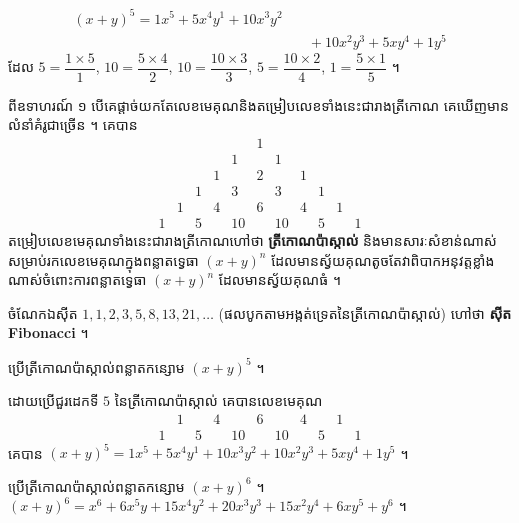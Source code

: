 \begin{example}[ឧទាហរណ៍ ២]
\[
\begin{aligned}
(x + y)^5 = 1x^5 + 5x^4y^1 + 10x^3y^2 &\\
&\quad + 10x^2y^3 + 5xy^4 + 1y^5
\end{aligned}
\]
ដែល $5 = \dfrac{1 \times 5}{1}$, \quad $10 = \dfrac{5 \times 4}{2}$, \quad $10 = \dfrac{10 \times 3}{3}$, \quad $5 = \dfrac{10 \times 2}{4}$, \quad $1 = \dfrac{5 \times 1}{5}$ ។
\end{example}

ពីឧទាហរណ៍ ១ បើគេផ្តាច់យកតែលេខមេគុណនិងតម្រៀបលេខទាំងនេះជារាងត្រីកោណ គេឃើញមានលំនាំគំរូជាច្រើន ។ គេបាន
\[
\begin{array}{ccccccccccc}
 & & & & & 1 & & & & & \\
 & & & & 1 & & 1 & & & & \\
 & & & 1 & & 2 & & 1 & & & \\
 & & 1 & & 3 & & 3 & & 1 & & \\
 & 1 & & 4 & & 6 & & 4 & & 1 & \\
1 & & 5 & & 10 & & 10 & & 5 & & 1
\end{array}
\]
តម្រៀបលេខមេគុណទាំងនេះជារាងត្រីកោណហៅថា \textbf{ត្រីកោណប៉ាស្កាល់} និងមានសារៈសំខាន់ណាស់សម្រាប់រកលេខមេគុណក្នុងពន្លាតទ្វេធា $(x + y)^n$ ដែលមានស្វ័យគុណតូចតែវាពិបាកអនុវត្តខ្លាំងណាស់ចំពោះការពន្លាតទ្វេធា $(x + y)^n$ ដែលមានស្វ័យគុណធំ ។

ចំណែកឯស៊ីត $1, 1, 2, 3, 5, 8, 13, 21, \ldots$ (ផលបូកតាមអង្កត់ទ្រេតនៃត្រីកោណប៉ាស្កាល់) ហៅថា \textbf{ស៊ីត Fibonacci} ។

\begin{example}[លំហាត់គំរូ ៤]
ប្រើត្រីកោណប៉ាស្កាល់ពន្លាតកន្សោម $(x + y)^5$ ។
\end{example}
\ans
ដោយប្រើជួរដេកទី $5$ នៃត្រីកោណប៉ាស្កាល់ គេបានលេខមេគុណ
\[
\begin{array}{ccccccccccc}
 & 1 & & 4 & & 6 & & 4 & & 1 & \\
1 & & 5 & & 10 & & 10 & & 5 & & 1
\end{array}
\]
គេបាន $(x + y)^5 = 1x^5 + 5x^4y^1 + 10x^3y^2 + 10x^2y^3 + 5xy^4 + 1y^5$ ។

\begin{pro}
ប្រើត្រីកោណប៉ាស្កាល់ពន្លាតកន្សោម $(x + y)^6$ ។
\ans
$(x + y)^6 = x^6 + 6x^5y + 15x^4y^2 + 20x^3y^3 + 15x^2y^4 + 6xy^5 + y^6$ ។
\end{pro}

